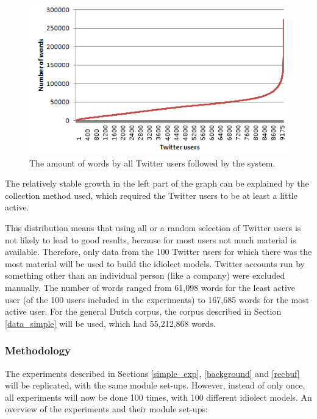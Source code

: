 \documentclass[11pt]{article}
\begin{document}
\begin{figure}[H] \centering
\includegraphics[scale=1]{zipf_twitter}
\caption{The amount of words by all Twitter users followed by the system.}
\label{lcurve}
\end{figure} 

The relatively stable growth in the left part of the graph can be explained by the collection method used, which required the Twitter users to be at least a little active. 

This distribution means that using all or a random selection of Twitter users is not likely to lead to good results, because for most users not much material is available. Therefore, only data from the 100 Twitter users for which there was the most material will be used to build the idiolect models. Twitter accounts run by something other than an individual person (like a company) were excluded manually. The number of words ranged from 61,098 words for the least active user (of the 100 users included in the experiments) to 167,685 words for the most active user. For the general Dutch corpus, the corpus described in Section \ref{data_simple} will be used, which had 55,212,868 words.

\subsubsection{Methodology}

The experiments described in Sections \ref{simple_exp}, \ref{background} and \ref{recbuf} will be replicated, with the same module set-ups. However, instead of only once, all experiments will now be done 100 times, with 100 different idiolect models. An overview of the experiments and their module set-ups:
\end{document}
